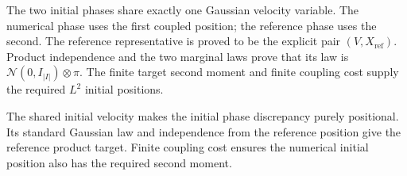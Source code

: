 \documentclass[11pt,a4paper]{article}
\begin{document}
The two initial phases share exactly one Gaussian velocity variable. The numerical phase uses the first coupled position; the reference phase uses the second. The reference representative is proved to be the explicit pair \((V,X_\mathrm{ref})\). Product independence and the two marginal laws prove that its law is \(\mathcal N(0,I_{|I|})\otimes\pi\). The finite target second moment and finite coupling cost supply the required \(L^{2}\) initial positions.



The shared initial velocity makes the initial phase discrepancy purely positional. Its standard Gaussian law and independence from the reference position give the reference product target. Finite coupling cost ensures the numerical initial position also has the required second moment.
\end{document}
